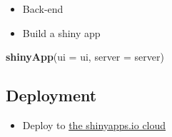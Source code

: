\documentclass[
]{book}
\newenvironment{Shaded}{\begin{snugshade}}{\end{snugshade}}
\newcommand{\ControlFlowTok}[1]{\textcolor[rgb]{0.13,0.29,0.53}{\textbf{#1}}}
\newcommand{\DataTypeTok}[1]{\textcolor[rgb]{0.13,0.29,0.53}{#1}}
\newcommand{\KeywordTok}[1]{\textcolor[rgb]{0.13,0.29,0.53}{\textbf{#1}}}
\newcommand{\NormalTok}[1]{#1}
\newcommand{\OperatorTok}[1]{\textcolor[rgb]{0.81,0.36,0.00}{\textbf{#1}}}
\newcommand{\StringTok}[1]{\textcolor[rgb]{0.31,0.60,0.02}{#1}}
\providecommand{\tightlist}{%
  \setlength{\itemsep}{0pt}\setlength{\parskip}{0pt}}
\begin{document}
\begin{itemize}
\tightlist
\item
  Back-end
\end{itemize}

\begin{Shaded}
\end{Shaded}

\begin{itemize}
\tightlist
\item
  Build a shiny app
\end{itemize}

\begin{Shaded}
\begin{Highlighting}[]
\KeywordTok{shinyApp}\NormalTok{(}\DataTypeTok{ui =}\NormalTok{ ui, }\DataTypeTok{server =}\NormalTok{ server)}
\end{Highlighting}
\end{Shaded}

\hypertarget{deployment}{%
\subsection{Deployment}\label{deployment}}

\begin{itemize}
\tightlist
\item
  Deploy to \href{https://www.shinyapps.io/?_ga=2.5503866.871102833.1602978469-100003412.1602392815}{the shinyapps.io cloud}
\end{itemize}
\end{document}
